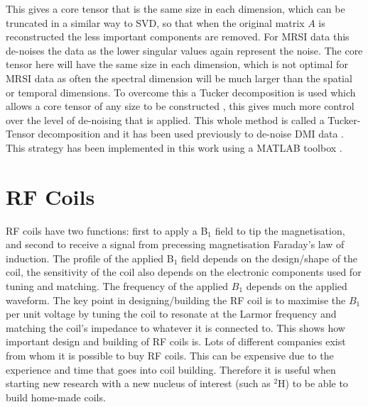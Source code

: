 \noindent This gives a core tensor that is the same size in each dimension, which can be truncated in a similar way to \ac{SVD}, so that when the original matrix $A$ is reconstructed the less important components are removed. For \ac{MRSI} data this de-noises the data as the lower singular values again represent the noise. The core tensor here will have the same size in each dimension, which is not optimal for \ac{MRSI} data as often the spectral dimension will be much larger than the spatial or temporal dimensions. To overcome this a Tucker decomposition is used which allows a core tensor of any size to be constructed \cite{Tucker1966SomeAnalysis}, this gives much more control over the level of de-noising that is applied. This whole method is called a Tucker-Tensor decomposition and it has been used previously to de-noise \ac{DMI} data \cite{Kreis2020MeasuringMRI, Assmann2020InCholesterol}. This strategy has been implemented in this work using a MATLAB toolbox \cite{Bader2007EfficientTensors}.


\section{RF Coils}

\ac{RF} coils have two functions: first to apply a B$_1$ field to tip the magnetisation, and second to receive a signal from precessing magnetisation Faraday's law of induction. The profile of the applied B$_1$ field depends on the design/shape of the coil, the sensitivity of the coil also depends on the electronic components used for tuning and matching. The frequency of the applied $B_1$ depends on the applied waveform. The key point in designing/building the \ac{RF} coil is to maximise the $B_1$ per unit voltage by tuning the coil to resonate at the Larmor frequency and matching the coil's impedance to whatever it is connected to. This shows how important design and building of \ac{RF} coils is. Lots of different companies exist from whom it is possible to buy \ac{RF} coils. This can be expensive due to the experience and time that goes into coil building. Therefore it is useful when starting new research with a new nucleus of interest (such as $^2$H) to be able to build home-made coils. 

